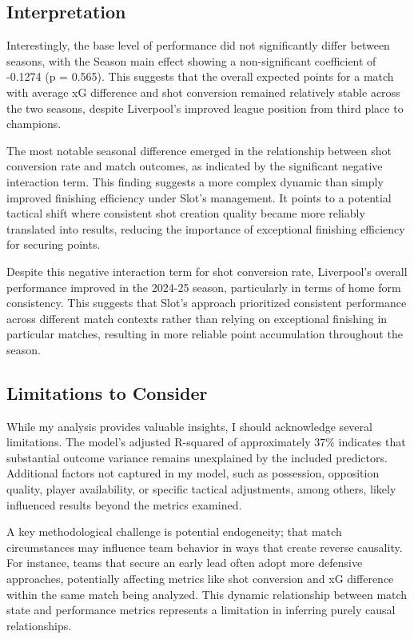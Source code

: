 \documentclass[12pt]{article}
\begin{document}
\subsection*{Interpretation}

Interestingly, the base level of performance did not significantly differ between seasons, with the Season main effect showing a non-significant coefficient of -0.1274 (p = 0.565). This suggests that the overall expected points for a match with average xG difference and shot conversion remained relatively stable across the two seasons, despite Liverpool's improved league position from third place to champions.

The most notable seasonal difference emerged in the relationship between shot conversion rate and match outcomes, as indicated by the significant negative interaction term. This finding suggests a more complex dynamic than simply improved finishing efficiency under Slot's management. It points to a potential tactical shift where consistent shot creation quality became more reliably translated into results, reducing the importance of exceptional finishing efficiency for securing points.

Despite this negative interaction term for shot conversion rate, Liverpool's overall performance improved in the 2024-25 season, particularly in terms of home form consistency. This suggests that Slot's approach prioritized consistent performance across different match contexts rather than relying on exceptional finishing in particular matches, resulting in more reliable point accumulation throughout the season.

\subsection*{Limitations to Consider}

While my analysis provides valuable insights, I should acknowledge several limitations. The model's adjusted R-squared of approximately 37\% indicates that substantial outcome variance remains unexplained by the included predictors. Additional factors not captured in my model, such as possession, opposition quality, player availability, or specific tactical adjustments, among others, likely influenced results beyond the metrics examined.

A key methodological challenge is potential endogeneity; that match circumstances may influence team behavior in ways that create reverse causality. For instance, teams that secure an early lead often adopt more defensive approaches, potentially affecting metrics like shot conversion and xG difference within the same match being analyzed. This dynamic relationship between match state and performance metrics represents a limitation in inferring purely causal relationships.
\end{document}
